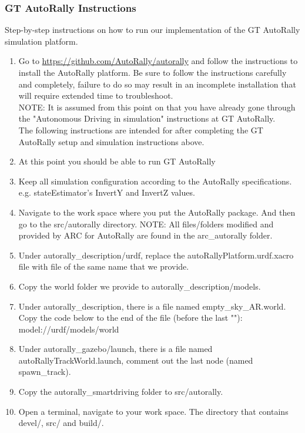 \documentclass[compsoc,draftclsnofoot,onecolumn,10pt]{IEEEtran}
\begin{document}
\subsubsection{GT AutoRally Instructions}
Step-by-step instructions on how to run our implementation of the GT AutoRally simulation platform.
\begin{enumerate}
	\item Go to \href{https://github.com/AutoRally/autorally}{https://github.com/AutoRally/autorally} and follow the instructions to install the AutoRally platform. Be sure to follow the instructions carefully and completely, failure to do so may result in an incomplete installation that will require extended time to troubleshoot.\\
	NOTE: It is assumed from this point on that you have already gone
through the "Autonomous Driving in simulation" instructions at GT AutoRally.\\
	The following instructions are intended for after completing the GT AutoRally setup and simulation instructions above.
	\item At this point you should be able to run GT AutoRally
	\item Keep all simulation configuration according to the AutoRally specifications.\\ e.g. stateEstimator's InvertY and InvertZ values.
	\item Navigate to the work space where you put the AutoRally package. And then go to the src/autorally directory.
	NOTE: All files/folders modified and provided by ARC for AutoRally are found in the arc\_autorally folder.\\
	\item Under autorally\_description/urdf, replace the autoRallyPlatform.urdf.xacro file with file of the same name that we provide.
	\item Copy the world folder we provide to autorally\_description/models.
	\item Under autorally\_description, there is a file named empty\_sky\_AR.world. Copy the code below to the end of the file (before the last ""):\\ model://urdf/models/world
	\item Under autorally\_gazebo/launch, there is a file named autoRallyTrackWorld.launch, comment out the last node (named spawn\_track).
	\item Copy the autorally\_smartdriving folder to src/autorally.
	\item Open a terminal, navigate to your work space. The directory that contains devel/, src/ and build/.

\end{enumerate}
\end{document}
